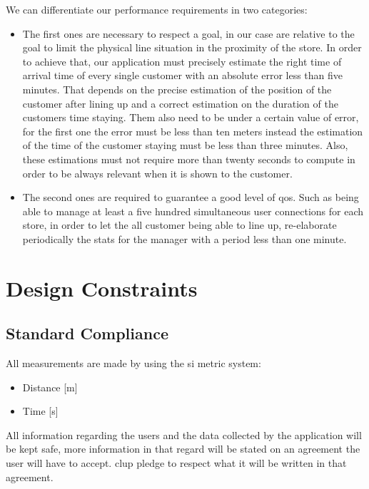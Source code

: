 We can differentiate our performance requirements in two categories:
\begin{itemize}
    \item The first ones are necessary to respect a goal, in our case are relative to the goal to limit the physical line situation in the proximity of the store. In order to achieve that, our application must precisely estimate the right time of arrival time of every single customer with an absolute error less than five minutes. That depends on the precise estimation of the position of the customer after lining up and a correct estimation on the duration of the customers time staying. Them also need to be under a certain value of error, for the first one the error must be less than ten meters instead the estimation of the time of the customer staying must be less than three minutes. Also, these estimations must not require more than twenty seconds to compute in order to be always relevant when it is shown to the customer.
    \item The second ones are required to guarantee a good level of \gls{qos}. Such as being able to manage at least a five hundred simultaneous user connections for each store, in order to let the all customer being able to line up, re-elaborate periodically the stats for the manager with a period less than one minute.

\end{itemize}


\section{Design Constraints}

\subsection{Standard Compliance}

All measurements are made by using the \gls{si} metric system:
\begin{itemize}
    \item Distance [m]
    \item Time [s]
\end{itemize}
All information regarding the users and the data collected by the application will be kept safe, more information in that regard will be stated on an agreement the user will have to accept. \gls{clup} pledge to respect what it will be written in that agreement. \\

